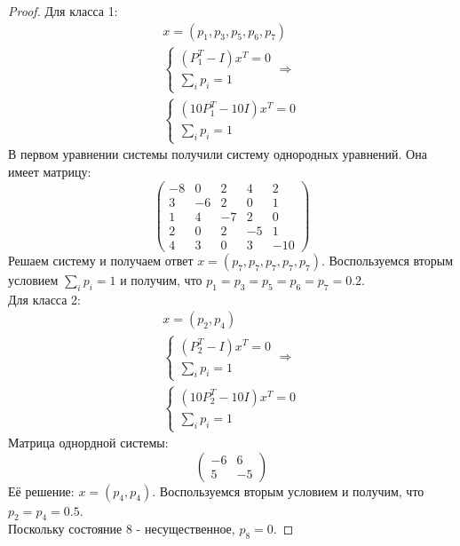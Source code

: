 \begin{proof}
Для класса 1:
\begin{gather*}
    x = (p_1, p_3, p_5, p_6, p_7)\\
    \begin{cases}
        (P_1^T - I)x^T = 0 \\
        \sum_i p_i = 1
    \end{cases} \Rightarrow \\
    \begin{cases}
        (10P_1^T - 10I)x^T = 0 \\
        \sum_i p_i = 1
    \end{cases}
\end{gather*}
В первом уравнении системы получили систему однородных уравнений. Она имеет матрицу:
\[
\begin{pmatrix}
   -8 & 0  & 2  & 4  & 2 \\
    3 & -6 & 2  & 0  & 1 \\
    1 & 4  & -7 & 2  & 0 \\
    2 & 0  & 2  & -5 & 1 \\
    4 & 3  & 0  & 3  & -10
\end{pmatrix}
\]
Решаем систему и получаем ответ $x = (p_7, p_7, p_7, p_7, p_7)$. Воспользуемся вторым условием $\sum_i p_i = 1$ и получим, что $p_1 = p_3 = p_5 = p_6 = p_7 = 0.2$.\\
Для класса 2:
\begin{gather*}
    x = (p_2, p_4)\\
    \begin{cases}
        (P_2^T - I)x^T = 0 \\
        \sum_i p_i = 1
    \end{cases} \Rightarrow \\
    \begin{cases}
        (10P_2^T - 10I)x^T = 0 \\
        \sum_i p_i = 1
    \end{cases}
\end{gather*}
Матрица однордной системы:
\[
\begin{pmatrix}
    -6 & 6 \\
     5 & -5
\end{pmatrix}
\]
Её решение: $x = (p_4, p_4)$. Воспользуемся вторым условием и получим, что $p_2 = p_4 = 0.5$.\\
Поскольку состояние 8 - несущественное, $p_8 = 0$.
\end{proof}